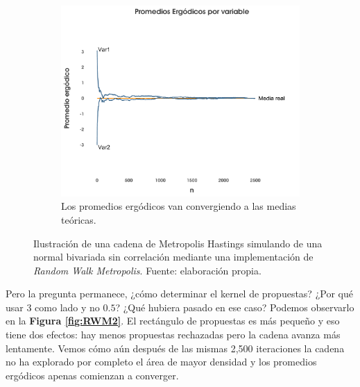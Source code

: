 \begin{figure}[h]
\begin{subfigure}{0.3\textwidth}
    \end{subfigure}
    ~
    \begin{subfigure}{0.3\textwidth}
        \includegraphics[width=\textwidth]{Figs/Bayes/Ejemplo_RWM_C}
        \caption{Los promedios ergódicos van convergiendo a las medias teóricas.}
    \end{subfigure}
    \caption{Ilustración de una cadena de Metropolis Hastings simulando de una normal bivariada sin correlación mediante una implementación de \textit{Random Walk Metropolis}. Fuente: elaboración propia.}\label{fig:RWM}
\end{figure}

Pero la pregunta permanece, ¿cómo determinar el kernel de propuestas? ¿Por qué usar $3$ como lado y no $0.5$? ¿Qué hubiera pasado en ese caso? Podemos observarlo en la \textbf{Figura \ref{fig:RWM2}}. El rectángulo de propuestas es más pequeño y eso tiene dos efectos: hay menos propuestas rechazadas pero la cadena avanza más lentamente. Vemos cómo aún después de las mismas 2,500 iteraciones la cadena no ha explorado por completo el área de mayor densidad y los promedios ergódicos apenas comienzan a converger.\\ 

